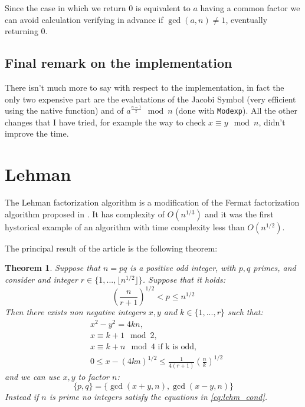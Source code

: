 \documentclass{article}
\theoremstyle{plain}
\newtheorem{teo}{Theorem}[section]
\theoremstyle{remark}
\theoremstyle{definition}
\begin{document}
Since the case in which we return $0$ is equivalent to $a$ having a common factor we can avoid calculation verifying in advance if $\gcd(a,n) \neq 1$, eventually returning $0$. 

\subsection{Final remark on the implementation}

There isn't much more to say with respect to the implementation, in fact the only two expensive part are the evalutations of the Jacobi Symbol (very efficient using the native function) and of $a^{\frac{n-1}{2}} \mod n$ (done with \texttt{Modexp}). All the other changes that I have tried, for example the way to check $x\equiv y \mod n$, didn't improve the time.  



\section{Lehman}

The Lehman factorization algorithm is a modification of the Fermat factorization algorithm proposed in \cite{lehman}. It has complexity of $O(n^{1/3})$ and it was the first hystorical example of an algorithm with time complexity less than $O(n^{1/2})$. 

The principal result of the article is the following theorem:

\begin{teo} \label{teo:lehm}
	Suppose that $n = pq$ is a positive odd integer, with $p,q$ primes, and consider and integer $r \in \{ 1,...,\lfloor n^{1/2}\rfloor\}$. Suppose that it holds:
	\begin{equation}
		\label{eq:p_cond}
		\left( \frac{n}{r+1}\right)^{1/2} < p \leq n^{1/2}
	\end{equation}
	Then there exists non negative integers $x,y$ and $k \in \{1,...,r\}$ such that:
	\begin{subequations} \label{eq:lehm_cond}
		\begin{align}
			&x^2 - y^2 = 4kn, \label{eq:lehm_cond_xy}\\
			&x \equiv k + 1 \mod 2, \label{eq:lehm_cond_1} \\
			&x \equiv k + n \mod 4 \text{ if k is odd},\label{eq:lehm_cond_2} \\
			&0 \leq x - (4kn)^{1/2} \leq \frac{1}{4(r+1)} \left(\frac{n}{k}\right)^{1/2} \label{eq:lehm_cond_it}
		\end{align}
	\end{subequations}
	and we can use $x,y$ to factor $n$:
	\begin{equation}
		\label{eq:lehm_fact}
		\{p,q\} = \{\gcd(x+y,n), \gcd(x-y,n)\}
	\end{equation}
	Instead if $n$ is prime no integers satisfy the equations in \ref{eq:lehm_cond}.
\end{teo}
\end{document}
